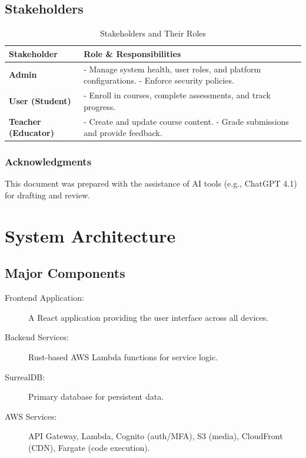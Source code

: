 \documentclass[a4paper, 11pt]{scrreprt}
\begin{document}
\section{Stakeholders}
\begin{table}[htbp]\setlength{\abovecaptionskip}{0pt}
    \centering
    \begin{tabularx}{\textwidth}{|l|X|}
        \hline
        \textbf{Stakeholder} & \textbf{Role \& Responsibilities} \\
        \hline
        \textbf{Admin} & - Manage system health, user roles, and platform configurations. \newline - Enforce security policies. \\
        \hline
        \textbf{User (Student)} & - Enroll in courses, complete assessments, and track progress. \\
        \hline
        \textbf{Teacher (Educator)} & - Create and update course content. \newline - Grade submissions and provide feedback. \\
        \hline
    \end{tabularx}
    \caption{Stakeholders and Their Roles}
\end{table}

\subsection{Acknowledgments}
This document was prepared with the assistance of AI tools (e.g., ChatGPT 4.1) for drafting and review.

\chapter{System Architecture}

\section{Major Components}

\begin{description}
    \item[Frontend Application:] A React application providing the user interface across all devices.
    \item[Backend Services:] Rust-based AWS Lambda functions for service logic.
    \item[SurrealDB:] Primary database for persistent data.
    \item[AWS Services:] API Gateway, Lambda, Cognito (auth/MFA), S3 (media), CloudFront (CDN), Fargate (code execution).
\end{description}
\end{document}
